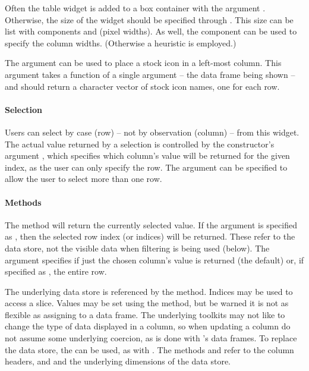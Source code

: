 Often the table widget is added to a box container with the argument
. Otherwise, the size of the widget should be specified
through . This size can be list with components 
and  (pixel widths). As well, the component
 can be used to specify the column
widths. (Otherwise a heuristic is employed.)

The  argument can be used to place a stock
icon in a left-most column.  This argument takes a function of a
single argument -- the data frame being shown -- and should return a
character vector of stock icon names, one for each row.

\paragraph{Selection}
Users can select by case (row) -- not by observation (column) -- from
this widget. The actual value returned by a selection is controlled by
the constructor's argument , which
specifies which column's value will be returned for the given index,
as the user can only specify the row. The 
argument can be specified to allow the user to select more than one
row.

\paragraph{Methods}
The  method will return the currently selected
value. If the argument  is specified as , then
the selected row index (or indices) will be returned. These refer to
the data store, not the visible data when filtering is being used (below). The
argument  specifies if just the chosen column's value is
returned (the default) or, if specified as , the entire row.
 
The underlying data store is referenced by the \method{[}{gtable}
method. Indices may be used to access a slice. Values may be
set using the \method{[\ASSIGN}{gtable} method, but be warned it is
not as flexible as assigning to a data frame. The underlying
toolkits may not like to change the type of data displayed in a
column, so when updating a column do not assume some underlying
coercion, as is done with \R's data frames. To replace the data store, the \code{[\ASSIGN} can
be used, as with . The methods
 and  refer to the
column headers, and  and 
the underlying dimensions of the data store.

